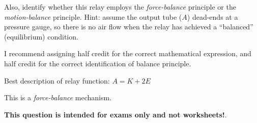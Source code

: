 Also, identify whether this relay employs the {\it force-balance} principle or the {\it motion-balance} principle.  Hint: assume the output tube ($A$) dead-ends at a pressure gauge, so there is no air flow when the relay has achieved a ``balanced'' (equilibrium) condition.







I recommend assigning half credit for the correct mathematical expression, and half credit for the correct identification of balance principle.

\vskip 10pt

Best description of relay function:  $A = K + 2E$

\vskip 10pt

This is a {\it force-balance} mechanism.







{\bf This question is intended for exams only and not worksheets!}.



